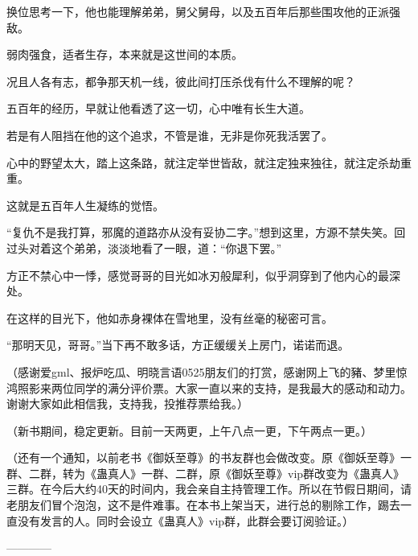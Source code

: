 \begin{this_body}
换位思考一下，他也能理解弟弟，舅父舅母，以及五百年后那些围攻他的正派强敌。

弱肉强食，适者生存，本来就是这世间的本质。

况且人各有志，都争那天机一线，彼此间打压杀伐有什么不理解的呢？

五百年的经历，早就让他看透了这一切，心中唯有长生大道。

若是有人阻挡在他的这个追求，不管是谁，无非是你死我活罢了。

心中的野望太大，踏上这条路，就注定举世皆敌，就注定独来独往，就注定杀劫重重。

这就是五百年人生凝练的觉悟。

“复仇不是我打算，邪魔的道路亦从没有妥协二字。”想到这里，方源不禁失笑。回过头对着这个弟弟，淡淡地看了一眼，道：“你退下罢。”

方正不禁心中一悸，感觉哥哥的目光如冰刃般犀利，似乎洞穿到了他内心的最深处。

在这样的目光下，他如赤身裸体在雪地里，没有丝毫的秘密可言。

“那明天见，哥哥。”当下再不敢多话，方正缓缓关上房门，诺诺而退。

（感谢爱gml、报炉吃瓜、明晓言语0525朋友们的打赏，感谢网上飞的豬、梦里惊鸿照影来两位同学的满分评价票。大家一直以来的支持，是我最大的感动和动力。谢谢大家如此相信我，支持我，投推荐票给我。）

（新书期间，稳定更新。目前一天两更，上午八点一更，下午两点一更。）

（还有一个通知，以前老书《御妖至尊》的书友群也会做改变。原《御妖至尊》一群、二群，转为《蛊真人》一群、二群，原《御妖至尊》vip群改变为《蛊真人》三群。在今后大约40天的时间内，我会亲自主持管理工作。所以在节假日期间，请老朋友们冒个泡泡，这不是件难事。在本书上架当天，进行总的剔除工作，踢去一直没有发言的人。同时会设立《蛊真人》vip群，此群会要订阅验证。）

------------

\end{this_body}

